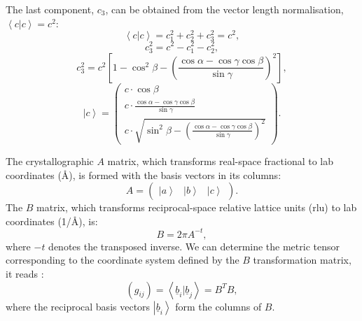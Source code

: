 The last component, $c_3$, can be obtained from the vector length normalisation, $ \left< c | c \right> = c^2 $:
\begin{equation} \left< c | c \right > = c_1^2 + c_2^2 + c_3^2 = c^2, \end{equation}
\begin{equation} c_3^2 = c^2 - c_1^2 - c_2^2, \end{equation}
\begin{equation} 
	c_3^2 = c^2 \left[1 - \cos^2 \beta - \left(\frac{\cos \alpha - \cos \gamma \cos \beta}{\sin \gamma} \right)^2 \right], 
\end{equation}
\begin{equation} \boxed{ \left| c \right> = \left( \begin{array}{c}
	c \cdot \cos \beta \\
	c \cdot \frac{\cos \alpha - \cos \gamma \cos \beta}{\sin \gamma} \\
	c \cdot \sqrt{ \sin^2 \beta - \left(\frac{\cos \alpha - \cos \gamma \cos \beta}{\sin \gamma} \right)^2 }
\end{array} \right). } \end{equation}



The crystallographic $A$ matrix, which transforms real-space fractional to lab coordinates (\AA), is formed with the basis vectors in its columns:
\begin{equation}
	A = \left(
		\begin{array}{ccc}
			\left| a \right> & \left| b \right> & \left| c \right>
		\end{array}
	\right).
\end{equation}
The $B$ matrix, which transforms reciprocal-space relative lattice units (rlu) to lab coordinates (1/\AA), is:
\begin{equation} B = 2 \pi A^{-t}, \end{equation}
where $-t$ denotes the transposed inverse.
We can determine the metric tensor corresponding to the coordinate system defined by the $B$ transformation matrix, it reads \cite[p. 808]{Arens2015}:
\begin{equation}
	\left(g_{ij}\right) = \left<\underline{b}_i | \underline{b}_j \right> = B^T B,
\end{equation}
where the reciprocal basis vectors $\left| \underline{b}_i \right>$ form the columns of $B$.


